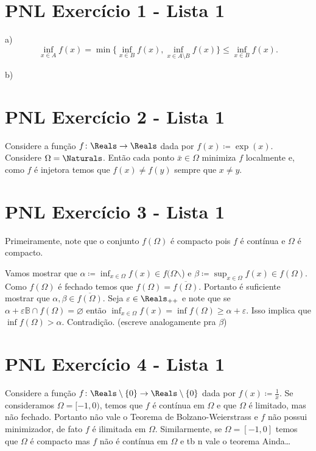 
\section{PNL Exercício 1 - Lista 1}
\label{sec:org41d184a}

a) \[\inf_{x\in A} f(x)=\min\{\inf_{x\in B}f(x), \inf_{x\in A\setminus B}f(x)\}\leq\inf_{x\in B}f(x).\]

b)

\section{PNL Exercício 2 - Lista 1}
\label{sec:org8affeec}

Considere a função \(f\colon\Reals\to\Reals\) dada por \(f(x)\coloneqq\exp(x)\). Considere \(\Omega=\Naturals\).
Então cada ponto \(\bar{x}\in\Omega\) minimiza \(f\) localmente e, como \(f\) é injetora temos que \(f(x)\not=f(y)\)
sempre que \(x\not= y\).

\section{PNL Exercício 3 - Lista 1}
\label{sec:orga567c7d}
Primeiramente, note que o conjunto \(f(\Omega)\) é compacto pois \(f\) é contínua e \(\Omega\) é compacto.

Vamos mostrar que \(\alpha\coloneqq\inf_{x\in\Omega}f(x)\in f(\Omega\)$\backslash$) e \(\beta\coloneqq\sup_{x\in\Omega}f(x)\in f(\Omega)\).
Como \(f(\Omega)\) é fechado temos que \(f(\Omega)=\overline{f(\Omega)}\). Portanto é suficiente mostrar que 
\(\alpha,\beta\in\overline{f(\Omega)}\). Seja \(\varepsilon\in\Reals_{++}\) e note que se \(\alpha +\varepsilon\mathbb{B}\cap f(\Omega)=\varnothing\) então \(\inf_{x\in\Omega}f(x)=\inf f(\Omega)\geq\alpha+\varepsilon\).
Isso implica que \(\inf f(\Omega) > \alpha\). Contradição. (escreve analogamente pra \(\beta\))


\section{PNL Exercício 4 - Lista 1}
\label{sec:org026ff9d}

Considere a função \(f\colon\Reals\setminus\{0\}\to\Reals\setminus\{0\}\) dada por \(f(x)\coloneqq\frac{1}{x}\). Se consideramos
\(\Omega=[-1,0)\), temos que \(f\) é contínua em \(\Omega\) e que \(\Omega\) é limitado, mas não fechado.
Portanto não vale o Teorema de Bolzano-Weierstrass e \(f\) não possui minimizador, de fato \(f\) é ilimitada em \(\Omega\).
Similarmente, se \(\Omega=[-1,0]\) temos que \(\Omega\) é compacto mas \(f\) não é contínua em \(\Omega\) e tb n vale o teorema
Ainda\ldots{}

